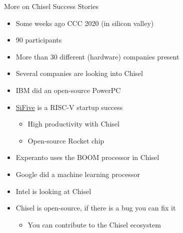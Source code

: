 
\begin{frame}[fragile]{More on Chisel Success Stories}
\begin{itemize}
\item Some weeks ago CCC 2020 (in silicon valley)
\item 90 participants
\item More than 30 different (hardware) companies present
\item Several companies are looking into Chisel
\item IBM did an open-source PowerPC
\item \href{https://www.sifive.com/}{SiFive} is a RISC-V startup success
\begin{itemize}
\item High productivity with Chisel
\item Open-source Rocket chip
\end{itemize}
\item Experanto uses the BOOM processor in Chisel
\item Google did a machine learning processor
\item Intel is looking at Chisel
\item Chisel is open-source, if there is a bug you can fix it
\begin{itemize}
\item You can contribute to the Chisel ecosystem
\end{itemize}
\end{itemize}
\end{frame}


